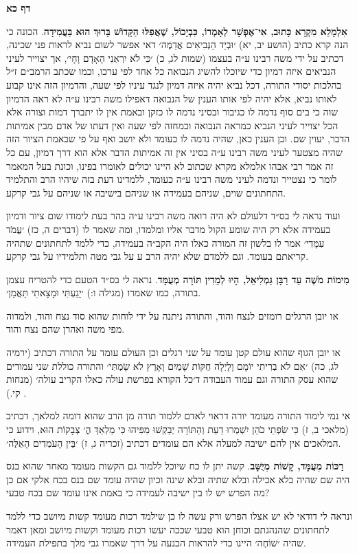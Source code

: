 \documentclass[12pt, openany]{book}
\newcommand{\sethebfont}{
\fontsize{10.5pt}{13.1pt} \selectfont
}
\newcommand{\textblock}[1]{
{\sethebfont #1\\}	
}
\newcommand{\sectname}{}
\newcommand{\newsection}[1]{
	\renewcommand{\sectname}{#1}	
	\vspace{-\baselineskip}
	\begin{center}
		\textbf{%
\fontsize{16pt}{16pt}\selectfont
			#1}
	\end{center}
	\vspace{-\baselineskip}
	\nopagebreak
}
\begin{document}
\clearpage
\newsection{דף כא}
\textblock{\textbf{אִלְמָלֵא מִקְרָא כָּתוּב, אִי־אֶפְשָׁר לְאָמְרוֹ, כִּבְיָכוֹל, שֶׁאֲפִלּוּ הַקָּדוֹשׁ בָּרוּךְ הוּא בַּעֲמִידָה}. הכונה כי הנה קרא כתיב {\small (הושע יב, יא)} ׳וּבְיַד הַנְּבִיאִים אֲדַמֶּה׳ דאי אפשר לשום נביא לראות פני שכינה, דכתיב על ידי משה רבינו ע״ה בעצמו {\small (שמות לג, כ)} ׳כִּי לֹא יִרְאַנִי הָאָדָם וָחָי׳, אך יצוייר לעיני הנביאים איזה דמיון כדי שיוכלו להשיג הנבואה כל אחד לפי ערכו, וכמו שכתב הרמב״ם ז״ל בהלכות יסודי התורה, דכל נביא יהיה איזה דמיון לנגד עיניו לפי שעה, והדמיון הזה אינו קבוע לאותו נביא, אלא יהיה לפי אותו הענין של הנבואה דאפילו משה רבינו ע״ה לא ראה הדמיון שוה כי בים סוף נדמה לו כגיבור ובסיני נדמה לו כזקן ובאמת אין לו יתברך דמות וצורה אלא הכל יצוייר לעיני הנביא כמראה הנבואה וכמחזה לפי שעה ואין דעתו של אדם מבין אמיתות הדבר, יעוין שם. וכן הענין כאן, שהיה נדמה לו כעומד ולא יושב ואף על פי שבאמת הציור הזה שהיה מצטער לעיני משה רבינו ע״ה בסיני אין זה אמיתות הדבר אלא הוא דרך דמיון, עם כל זה אמר רבי אבהו אלמלא מקרא שכתוב לא היינו יכולים לאומרו בפינו, וכונת בעל המאמר לומר כי נצטייר ונדמה לעיני משה רבינו ע״ה כעומד, ללמדינו דעת בזה שיהיו הרב והתלמיד התחתונים שוים, שניהם בעמידה או שניהם בישיבה או שניהם על גבי קרקע.\par ועוד נראה לי בס״ד דלעולם לא היה רואה משה רבינו ע״ה בהר בעת לימודו שום ציור ודמיון בעמידה אלא רק היה שומע הקול מדבר אליו ומלמדו, ומה שאמר לו {\small (דברים ה, כז)} ׳עֲמֹד עִמָּדִי׳ אמר לו בלשון זה המורה כאלו היה הקב״ה בעמידה, כדי ללמד לתחתונים שתהיה קריאתם בעומד. וגם ללמדם שלא יהיה הרב ע על גבי מטה ותלמידיו על גבי קרקע.}
\textblock{\textbf{מִימוֹת מֹשֶׁה עַד רַבָּן גַּמְלִיאֵל, הָיוּ לְמֵדִין תּוֹרָה מְעֻמָּד}. נראה לי בס״ד הטעם כדי להטריח עצמן בתורה, כמו שאמרו {\small (מגילה ו:)} ׳יָגַעְתִּי וּמָצָאתִי תַּאֲמֵן׳.\par או יובן הרגלים רומזים לנצח והוד, והתורה ניתנה על ידי לוחות שהוא סוד נצח והוד, ולמדוה מפי משה ואהרן שהם נצח והוד.\par או יובן הגוף שהוא עולם קטן עומד על שני רגלים וכן העולם עומד על התורה דכתיב {\small (ירמיה לג, כה)} ׳אִם לֹא בְרִיתִי יוֹמָם וָלָיְלָה חֻקּוֹת שָׁמַיִם וָאָרֶץ לֹא שָׂמְתִּי׳ והתורה כוללת שני עמודים שהוא עסק התורה וגם עמוד העבודה ד׳כל הקורא בפרשת עולה כאלו הקריב עולה׳ {\small (מנחות קי.)} .\par אי נמי לימוד התורה מעומד יורה דראוי לאדם ללמוד תורה מן הרב שהוא דומה למלאך, דכתיב {\small (מלאכי ב, ז)} כִּי שִׂפְתֵי כֹהֵן יִשְׁמְרוּ דַעַת וְהַתּוֹרָה יְבַקְשׁוּ מִפִּיהוּ כִּי מַלְאַךְ הֳ׳ צְבָקוֹת הוּא, וידוע כי המלאכים אין להם ישיבה למעלה אלא הם עומדים דכתיב {\small (זכריה ג, ז)} ׳בֵּין הָעֹמְדִים הָאֵלֶּה׳.}
\textblock{\textbf{רַכּוֹת מְעֻמָּד, קָשׁוֹת מְיֻשָּׁב}. קשה יתן לו כח שיוכל ללמוד גם הקשות מעומד מאחר שהוא בנס היה שם שהיה בלא אכילה ובלא שתיה ובלא שינה וכיון שהיה עומד שם בנס בכח אלקי אם כן מה הפרש יש לו בין ישיבה לעמידה כי באמת אינו עומד שם בכח טבעי?\par ונראה לי דודאי לא יש אצלו הפרש ורק עשה לו כן שילמד רכות מעומד קשות מיושב כדי ללמד לתחתונים שהנהגתם וכוחן הוא טבעי שככה יעשו רכות מעומד וקשות מיושב ומאן דאמר שהיה ׳שׁוֹחֶה׳ היינו כדי להראות הכנעה על דרך שאמרו גבי מלך בתפילת העמידה.}

\end{document}
